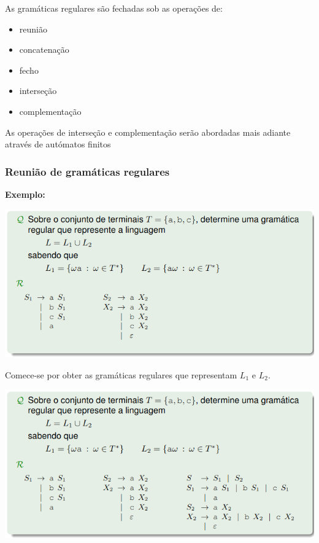 \documentclass{article}
\begin{document}
\begin{flushleft}
  \item As gramáticas regulares são fechadas sob as operações de:
  \begin{itemize}
    \item reunião
    \item concatenação
    \item fecho
    \item interseção
    \item complementação
  \end{itemize}

  \item As operações de interseção e complementação serão abordadas mais adiante através
  de autómatos finitos 

  \pagebreak

  \subsubsection{Reunião de gramáticas regulares}

  \item \textbf{Exemplo:}

  \begin{center}
    \includegraphics[scale=0.4]{5}
  \end{center}

  Comece-se por obter as gramáticas regulares que representam $L_1$ e $L_2$.

  \begin{center}
    \includegraphics[scale=0.4]{6}
  \end{center}
  

\end{flushleft}
\end{document}
